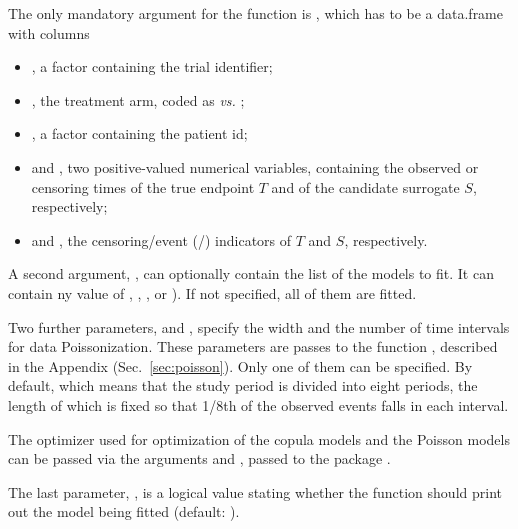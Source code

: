 \documentclass[article,shortnames, nojss]{jss}\usepackage[]{graphicx}\usepackage[]{color}
\begin{document}
  The only mandatory argument for the  function is
  , which has to be a data.frame with columns
  \begin{itemize}
  \item {}, a factor containing the trial identifier;
  \item {}, the treatment arm, coded as  \textit{vs.} ;
  \item {}, a factor containing the patient id;
  \item {} and , two positive-valued numerical variables,
  containing the observed or censoring times of the true endpoint $T$
  and of the candidate surrogate $S$, respectively;
  \item {} and ,
  the censoring/event (/) indicators of $T$ and $S$, respectively.
  \end{itemize}
  
  A second argument, , can optionally contain the list of the models to fit.
  It can contain  ny value of 
  , , , or ).
  If not specified, all of them are fitted.
  
  Two further parameters,  and ,
  specify the width and the number of time intervals for data Poissonization.
  These parameters are passes to the function ,
  described in the Appendix (Sec.~\ref{sec:poisson}).
  Only one of them can be specified.
  By default,  which means that the study period is divided into
  eight periods, the length of which is fixed so that 1/8th of the observed
  events falls in each interval.
  
  The optimizer used for optimization of the copula models and the Poisson models
  can be passed via the arguments  and ,
  passed to the  package \citep{optimxJSS, R:optimx}.
  
  The last parameter, , is a logical value
  stating whether the function should print out the model being fitted
  (default: ).
  
\end{document}
